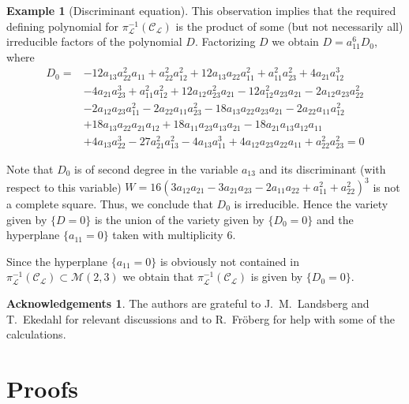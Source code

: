 \documentclass[10pt,twoside,a4paper,reqno]{amsart}
\theoremstyle{plain}
\theoremstyle{definition}
\newtheorem{exam+}           {Example}
\newtheorem*{ack}            {Acknowledgements}
\theoremstyle{remark}
\newenvironment{example}{\begin{exam+}}{\end{exam+}}
\begin{document}
\begin{example}[Discriminant equation]
This observation implies that the required defining polynomial for $\pi_{\mathcal L}^{-1}({\mathcal C}_{\mathcal L})$ is the product of some (but not necessarily all) irreducible factors of the polynomial $D$.
Factorizing $D$ we obtain $D=a_{11}^6 D_0$, where
\begin{equation*}
\begin{split}
D_0=& -12a_{13} a_{22}^2 a_{11}+a_{22}^2 a_{12}^2+12 a_{13} a_{22}
a_{11}^2+ a_{11}^2 a_{23}^2+4 a_{21}a_{12}^3\\
&-4 a_{21}a_{23}^3+a_{11}^2a_{12}^2
+12 a_{12}a_{23}^2a_{21} -12 a_{12}^2 a_{23} a_{21}-2 a_{12} a_{23}
a_{22}^2\\
&- 2 a_{12} a_{23} a_{11}^2-2
a_{22} a_{11} a_{23}^2-18 a_{13} a_{22} a_{23} a_{21}
- 2 a_{22}a_{11} a_{12}^2\\
&+18 a_{13} a_{22} a_{21} a_{12}
+18 a_{11}a_{23} a_{13} a_{21}- 18 a_{21} a_{13} a_{12} a_{11}\\
&+4 a_{13}
a_{22}^3-27 a_{21}^2 a_{13}^2-4 a_{13} a_{11}^3+ 4 a_{12} a_{23}
a_{22} a_{11}+a_{22}^2 a_{23}^2=0
\end{split}
\end{equation*}

Note that $D_0$ is of second degree in the variable $a_{13}$ and its 
discriminant (with respect to this variable) $W=
16(3a_{12}a_{21}-3a_{21}a_{23}-2a_{11}a_{22}+a_{11}^2+a_{22}^2)^3$
is not a complete square. Thus, we conclude that $D_0$ is irreducible. Hence the
variety given by $\{D=0\}$ is the union of the variety given by
$\{D_0=0\}$ and the hyperplane $\{a_{11}=0\}$ taken with multiplicity $6$.

Since the hyperplane  $\{a_{11}=0\}$ is obviously not contained in  $\pi_{\mathcal L}^{-1}({\mathcal C}_{\mathcal L}) \subset {\mathcal {M}}(2,3)$ we obtain that $\pi_{\mathcal L}^{-1}({\mathcal C}_{\mathcal L})$ is given by  $\{D_0=0\}$. 
\end{example}

\begin{ack}
The authors are grateful to J.~M.~Landsberg and T.~Ekedahl for relevant discussions and to R.~Fr\"oberg for help with some of the calculations.
\end{ack}

\section{Proofs}\label{s1}
\end{document}
